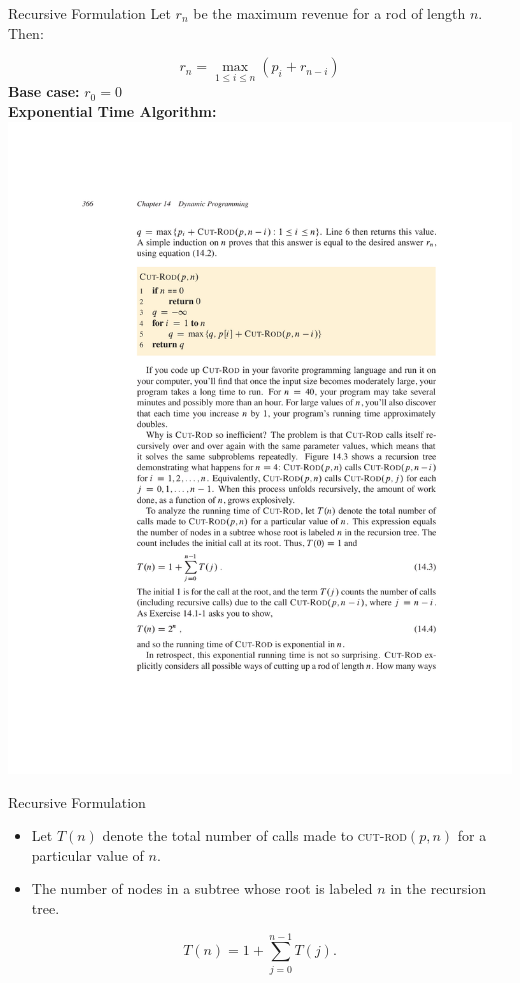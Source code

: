 \documentclass{beamer}
\begin{document}
\begin{frame}{Recursive Formulation}
    Let $r_n$ be the maximum revenue for a rod of length $n$. Then:

    \[
    r_n = \max_{1 \leq i \leq n} (p_i + r_{n-i})
    \]
    \textbf{Base case:} $r_0 = 0$ \\
    \vspace{1em}
    \textbf{Exponential Time Algorithm:}
    \centering
    \includegraphics[width=\textwidth,clip=true,trim=4.75cm 18cm 3cm 6cm]{figures/p366}
\end{frame}

\begin{frame}{Recursive Formulation}
    \begin{itemize}
        \item Let $T(n)$ denote the total number of calls made to \textsc{cut-rod}$(p,n)$ for a particular value of $n$.
        \item The number of nodes in a subtree whose root is labeled $n$ in the recursion tree.
    \end{itemize}
    $$
        T(n) = 1 + \sum_{j = 0}^{n - 1} T(j).
    $$
\end{frame}
\end{document}
